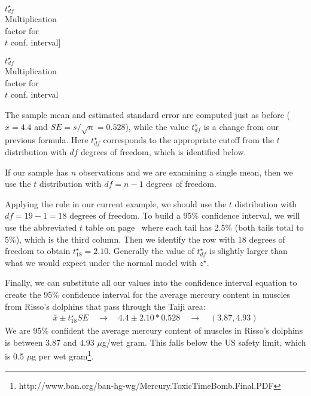 $t^{\star}_{df}$\vspace{1mm}\\\footnotesize Multiplication\\factor for\\$t$ conf. interval]{\raggedright\vspace{-9mm}

$t^{\star}_{df}$\vspace{1mm}\\\footnotesize Multiplication\\factor for\\$t$ conf. interval}The sample mean and estimated standard error are computed just as before ($\bar{x} = 4.4$ and $SE = s/\sqrt{n} = 0.528$), while the value $t^{\star}_{df}$ is a change from our previous formula. Here $t^{\star}_{df}$ corresponds to the appropriate cutoff from the $t$ distribution with $df$ degrees of freedom, which is identified below. 

\begin{termBox}{
If our sample has $n$ observations and we are examining a single mean, then we use the $t$ distribution with $df=n-1$ degrees of freedom.}
\end{termBox}

Applying the rule in our current example, we should use the $t$ distribution with $df=19-1=18$ degrees of freedom. To build a 95\% confidence interval, we will use the abbreviated $t$ table on page~\pageref{tTableSample} where each tail has 2.5\% (both tails total to 5\%), which is the third column. Then we identify the row with 18 degrees of freedom to obtain $t^{\star}_{18} = 2.10$. Generally the value of $t^{\star}_{df}$ is slightly larger than what we would expect under the normal model with $z^{\star}$.



Finally, we can substitute all our values into the confidence interval equation to create the 95\% confidence interval for the average mercury content in muscles from Risso's dolphins that pass through the Taiji area:
\begin{eqnarray*}
\bar{x} \pm t^{\star}_{18}SE
	\quad \to \quad
4.4 \pm 2.10 * 0.528
	\quad \to \quad
(3.87, 4.93)
\end{eqnarray*}
We are 95\% confident the average mercury content of muscles in Risso's dolphins is between 3.87 and 4.93 $\mu$g/wet gram. This falls below the US safety limit, which is 0.5 $\mu$g per wet gram\footnote{http://www.ban.org/ban-hg-wg/Mercury.ToxicTimeBomb.Final.PDF}.  %

